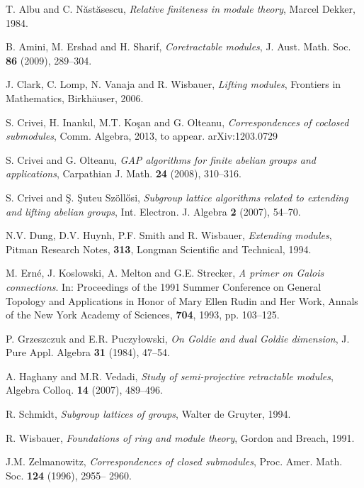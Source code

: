 \documentclass[11pt,a4paper]{amsart}
\begin{document}
\begin{thebibliography}{99}

 T. Albu and C. N\u ast\u asescu, \emph{Relative finiteness in module theory}, Marcel Dekker, 1984.

 B. Amini, M. Ershad and H. Sharif, \emph{Coretractable modules}, J. Aust. Math. Soc. {\bf 86} (2009),
289--304. 

 J. Clark, C. Lomp, N. Vanaja and R. Wisbauer, \emph{Lifting modules}, Frontiers in Mathematics,
Birkh\"auser, 2006.

 S. Crivei, H. Inank\i l, M.T. Ko\c san and G. Olteanu, \emph{Correspondences of coclosed submodules},
Comm. Algebra, 2013, to appear. arXiv:1203.0729

 S. Crivei and G. Olteanu, {\it GAP algorithms for finite abelian groups and applications}, 
Carpathian J. Math. {\bf 24} (2008), 310--316.

 S. Crivei and \c S. \c Suteu Sz\"oll\H{o}si, \emph{Subgroup lattice algorithms related to extending and
lifting abelian groups}, Int. Electron. J. Algebra {\bf 2} (2007), 54--70.

 N.V. Dung, D.V.  Huynh, P.F.  Smith and R. Wisbauer, \emph{Extending modules}, Pitman Research Notes,
{\bf 313}, Longman Scientific and Technical, 1994.

 M. Ern\'e, J. Koslowski, A. Melton and G.E. Strecker, \emph{A primer on Galois connections}. In:
Proceedings of the 1991 Summer Conference on General Topology and Applications in Honor of Mary Ellen Rudin and Her
Work, Annals of the New York Academy of Sciences, {\bf 704}, 1993, pp. 103--125.

 P. Grzeszczuk and E.R. Puczy\l owski, \emph{On Goldie and dual Goldie dimension}, J. Pure Appl. Algebra
{\bf 31} (1984), 47--54.

 A. Haghany and M.R. Vedadi, \emph{Study of semi-projective retractable modules}, Algebra Colloq. {\bf 14}
(2007), 489--496.

 R. Schmidt, \emph{Subgroup lattices of groups}, Walter de Gruyter, 1994. 

 R. Wisbauer, \emph{Foundations of ring and module theory}, Gordon and Breach, 1991.

 J.M. Zelmanowitz, \emph{Correspondences of closed submodules}, Proc. Amer. Math. Soc. {\bf 124} (1996),
2955-- 2960.

\end{thebibliography}
\end{document}
